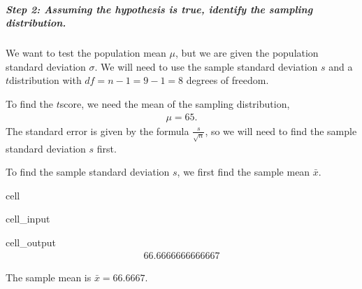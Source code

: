 \documentclass[letterpaper,10pt,english]{jupyterBook}
\begin{document}
\subparagraph{Step 2: Assuming the hypothesis is true, identify the sampling distribution.}
\label{\detokenize{Ch6 An Introduction to Hypothesis Testing/6.1 An Introduction to Hypothesis Testing:id8}}
\sphinxAtStartPar
We want to test the population mean \(\mu\), but we are  given the population standard deviation \(\sigma\). We will need to use the sample standard deviation \(s\) and a \(t\)\sphinxhyphen{}distribution with \(df = n - 1 = 9 - 1 = 8\) degrees of freedom.

\sphinxAtStartPar
To find the \(t\)\sphinxhyphen{}score, we need the mean of the sampling distribution,
\begin{equation*}
\begin{split} \mu = 65. \end{split}
\end{equation*}
\sphinxAtStartPar
The standard error is given by the formula \(\frac{s}{\sqrt{n}}\), so we will need to find the sample standard deviation \(s\) first.

\sphinxAtStartPar
To find the sample standard deviation \(s\), we first find the sample mean \(\bar{x}\).

\begin{sphinxuseclass}{cell}\begin{sphinxVerbatimInput}

\begin{sphinxuseclass}{cell_input}
\begin{sphinxVerbatim}[commandchars=\\\{\}]

\end{sphinxVerbatim}

\end{sphinxuseclass}\end{sphinxVerbatimInput}
\begin{sphinxVerbatimOutput}

\begin{sphinxuseclass}{cell_output}\begin{equation*}
\begin{split}66.6666666666667\end{split}
\end{equation*}
\end{sphinxuseclass}\end{sphinxVerbatimOutput}

\end{sphinxuseclass}
\sphinxAtStartPar
The sample mean is \(\bar{x} = 66.6667\).
\end{document}
